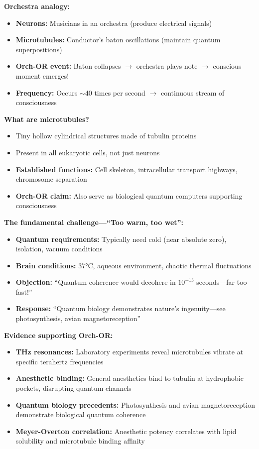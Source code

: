 \textbf{Orchestra analogy:}
\begin{itemize}
\item \textbf{Neurons:} Musicians in an orchestra (produce electrical signals)
\item \textbf{Microtubules:} Conductor's baton oscillations (maintain quantum superpositions)
\item \textbf{Orch-OR event:} Baton collapses $\rightarrow$ orchestra plays note $\rightarrow$ conscious moment emerges!
\item \textbf{Frequency:} Occurs $\sim$40 times per second $\rightarrow$ continuous stream of consciousness
\end{itemize}

\textbf{What are microtubules?}
\begin{itemize}
\item Tiny hollow cylindrical structures made of tubulin proteins
\item Present in all eukaryotic cells, not just neurons
\item \textbf{Established functions:} Cell skeleton, intracellular transport highways, chromosome separation
\item \textbf{Orch-OR claim:} Also serve as biological quantum computers supporting consciousness
\end{itemize}

\textbf{The fundamental challenge---``Too warm, too wet'':}
\begin{itemize}
\item \textbf{Quantum requirements:} Typically need cold (near absolute zero), isolation, vacuum conditions
\item \textbf{Brain conditions:} 37°C, aqueous environment, chaotic thermal fluctuations
\item \textbf{Objection:} ``Quantum coherence would decohere in $10^{-13}$ seconds---far too fast!''
\item \textbf{Response:} ``Quantum biology demonstrates nature's ingenuity---see photosynthesis, avian magnetoreception''
\end{itemize}

\textbf{Evidence supporting Orch-OR:}
\begin{itemize}
\item \textbf{THz resonances:} Laboratory experiments reveal microtubules vibrate at specific terahertz frequencies
\item \textbf{Anesthetic binding:} General anesthetics bind to tubulin at hydrophobic pockets, disrupting quantum channels
\item \textbf{Quantum biology precedents:} Photosynthesis and avian magnetoreception demonstrate biological quantum coherence
\item \textbf{Meyer-Overton correlation:} Anesthetic potency correlates with lipid solubility and microtubule binding affinity
\end{itemize}

